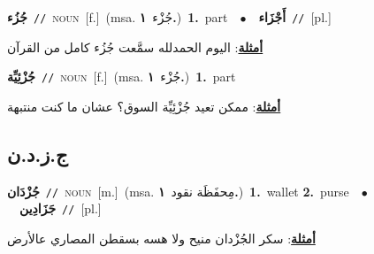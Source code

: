 \documentclass[10pt,a4paper,twoside]{article} %
\begin{document}
\begin{multicols}{2}
{\setlength\topsep{0pt}\textbf{\foreignlanguage{arabic}{جُزُء}}\ {\color{gray}\texttt{//}\color{black}}\ \textsc{noun}\ [f.]\ \color{gray}(msa. \foreignlanguage{arabic}{جُزْء}~\foreignlanguage{arabic}{\textbf{١.}})\color{black}\ \textbf{1.}~part\ \ $\bullet$\ \ \setlength\topsep{0pt}\textbf{\foreignlanguage{arabic}{أَجْزَاء}}\ {\color{gray}\texttt{//}\color{black}}\ [pl.]\  \begin{flushright}\color{gray}\foreignlanguage{arabic}{\textbf{\underline{\foreignlanguage{arabic}{أمثلة}}}: اليوم الحمدلله سمَّعت جُزُء كامل من القرآن}\end{flushright}\color{black}} \vspace{2mm}

{\setlength\topsep{0pt}\textbf{\foreignlanguage{arabic}{جُزْئِيِّة}}\ {\color{gray}\texttt{//}\color{black}}\ \textsc{noun}\ [f.]\ \color{gray}(msa. \foreignlanguage{arabic}{جُزْء}~\foreignlanguage{arabic}{\textbf{١.}})\color{black}\ \textbf{1.}~part\  \begin{flushright}\color{gray}\foreignlanguage{arabic}{\textbf{\underline{\foreignlanguage{arabic}{أمثلة}}}: ممكن تعيد جُزْئِيِّة السوق؟ عشان ما كنت منتبهة}\end{flushright}\color{black}} \vspace{2mm}

\vspace{-3mm}
\subsection*{\color{blue}\foreignlanguage{arabic}{ج.ز.د.ن}\color{blue}{ (ntws)}} 

{\setlength\topsep{0pt}\textbf{\foreignlanguage{arabic}{جُزْدَان}}\ {\color{gray}\texttt{//}\color{black}}\ \textsc{noun}\ [m.]\ \color{gray}(msa. \foreignlanguage{arabic}{مِحفَظَة نقود}~\foreignlanguage{arabic}{\textbf{١.}})\color{black}\ \textbf{1.}~wallet  \textbf{2.}~purse\ \ $\bullet$\ \ \setlength\topsep{0pt}\textbf{\foreignlanguage{arabic}{جَزَادِين}}\ {\color{gray}\texttt{//}\color{black}}\ [pl.]\  \begin{flushright}\color{gray}\foreignlanguage{arabic}{\textbf{\underline{\foreignlanguage{arabic}{أمثلة}}}: سكر الجُزْدان منيح ولا هسه بسقطن المصاري عالأرض}\end{flushright}\color{black}} \vspace{2mm}


\end{multicols}
\end{document}
